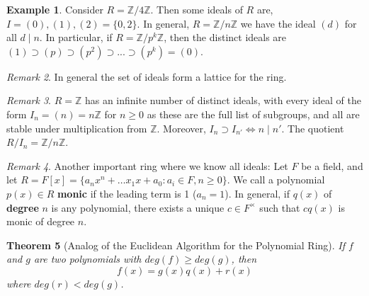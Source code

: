 \documentclass[12pt]{article}
\newtheorem{thm}{Theorem}[section]
\theoremstyle{definition}
\newtheorem{eg}[thm]{Example}
\theoremstyle{remark}
\newtheorem{rmk}[thm]{Remark}
\numberwithin{equation}{section}
\newcommand\Z{\mathbb Z}    %
\newcommand\B[1]{\textbf{ #1}}
\begin{document}
\vspace{15pt}

\begin{eg}
        Consider $R = \Z/4\Z$. Then some ideals of $R$ are, $I = (0),(1),(2) = \{0,2\}$. In general, $R = \Z/n\Z$ we have the ideal $(d)$ for all $d \;\vert\;n$. In particular, if $R = \Z/p^k\Z$, then the distinct ideals are $(1)\supset(p)\supset(p^2)\supset...\supset(p^k)=(0)$.
\end{eg}


\vspace{15pt}


\begin{rmk}
        In general the set of ideals form a lattice for the ring.
\end{rmk}


\vspace{15pt}

\begin{rmk}
        $R = \Z$ has an infinite number of distinct ideals, with every ideal of the form $I_n = (n) = n\Z$ for $n\geq 0$ as these are the full list of subgroups, and all are stable under multiplication from $\Z$. Moreover, $I_n \supset I_{n'} \iff n\;\vert\;n'$. The quotient $R/I_n = \Z/n\Z$.
\end{rmk}

\vspace{15pt}

\begin{rmk}
        Another important ring where we know all ideals: Let $F$ be a field, and let $R = F[x] = \{a_nx^n+\hdots x_1x+a_0: a_i \in F, n \geq 0\}$. We call a polynomial $p(x) \in R$ \B{monic} if the leading term is 1 ($a_n = 1$). In general, if $q(x)$ of \B{degree} $n$ is any polynomial, there exists a unique $c \in F^{\times}$ such that $cq(x)$ is monic of degree $n$. 
\end{rmk}

\vspace{15pt}

\begin{thm}[Analog of the Euclidean Algorithm for the Polynomial Ring]
        If $f$ and $g$ are two polynomials with $deg(f) \geq deg(g)$, then \begin{equation}
                f(x) = g(x)q(x)+r(x)
        \end{equation}
        where $deg(r) < deg(g)$.
\end{thm}

\vspace{15pt}
\end{document}

